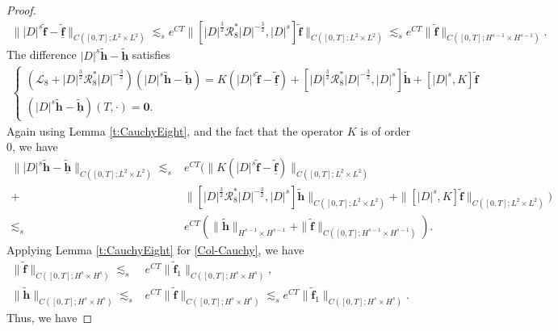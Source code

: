 \documentclass[12pt]{amsart}
\theoremstyle{remark}
\theoremstyle{definition}
\numberwithin{equation}{section}
\newcommand{\f}{\frac}
\newcommand{\mL}{\mathcal{L}}
\newcommand{\mR}{\mathcal{R}}
\begin{document}
\begin{proof}
\begin{align*}
 \| |D|^s\widetilde{\mathbf{f}}-\underline{\widetilde{\mathbf{f}}}\|_{C([0,T]; L^2\times L^2)}\lesssim_s e^{CT}\|[|D|^{\f32}\mR^*_8|D|^{-\f32},|D|^s]\widetilde{\mathbf{f}}\|_{C([0,T]; L^2\times L^2)} \lesssim_s e^{CT}\|\widetilde{\mathbf{f}} \|_{C([0,T]; H^{s-1}\times H^{s-1})}.  
\end{align*}
The difference $|D|^s\widetilde{\mathbf{h}}-\underline{\widetilde{\mathbf{h}}}$ satisfies
\begin{align*}
\begin{cases}
(\mL_8 + |D|^{\f32}\mR^*_8|D|^{-\f32})(|D|^s\widetilde{\mathbf{h}}-\underline{\widetilde{\mathbf{h}}})=K(|D|^s\widetilde{\mathbf{f}}-\underline{\widetilde{\mathbf{f}}})+[|D|^{\f32}\mR^*_8|D|^{-\f32},|D|^s]\widetilde{\mathbf{h}}+[|D|^s,K]\widetilde{\mathbf{f}}\\
(|D|^s\widetilde{\mathbf{h}}-\underline{\widetilde{\mathbf{h}}})(T,\cdot)= \mathbf{0}.
\end{cases}
\end{align*}
Again using Lemma \ref{t:CauchyEight}, and the fact that the operator $K$ is of order $0$, we have
\begin{align*}
 \| |D|^s\widetilde{\mathbf{h}}-\underline{\widetilde{\mathbf{h}}}\|_{C([0,T]; L^2\times L^2)} 
 \lesssim_s& e^{CT}\Big(\|K(|D|^s\widetilde{\mathbf{f}}-\underline{\widetilde{\mathbf{f}}})\|_{C([0,T];L^2\times L^2)} \\
 +& \|[|D|^{\f32}\mR^*_8|D|^{-\f32},|D|^s]\widetilde{\mathbf{h}}\|_{C([0,T];L^2\times L^2)} +\|[|D|^s,K]\widetilde{\mathbf{f}}\|_{C([0,T];L^2\times L^2)}\Big)\\
 \lesssim_s& e^{CT}\left(\|\widetilde{\mathbf{h}} \|_{H^{s-1}\times H^{s-1}} + \|\widetilde{\mathbf{f}}\|_{C([0,T]; H^{s-1}\times H^{s-1})}\right).  
\end{align*}
Applying Lemma \ref{t:CauchyEight} for \eqref{Col-Cauchy}, we have
\begin{equation}\label{Col-Cauchy-es}
\begin{aligned}
\|\widetilde{\mathbf{f}}\|_{C([0,T]; H^s\times H^s)} \lesssim_s& e^{CT} \|\widetilde{\mathbf{f}}_1\|_{C([0,T]; H^{s}\times H^{s})},\\
\|\widetilde{\mathbf{h}}\|_{C([0,T]; H^s\times H^s)} \lesssim_s&e^{CT} \|\widetilde{\mathbf{f}}\|_{C([0,T]; H^{s}\times H^{s})}\lesssim_s e^{CT} \|\widetilde{\mathbf{f}}_1\|_{C([0,T]; H^{s}\times H^{s})}.
\end{aligned}
\end{equation}
Thus, we have

\end{proof}
\end{document}
